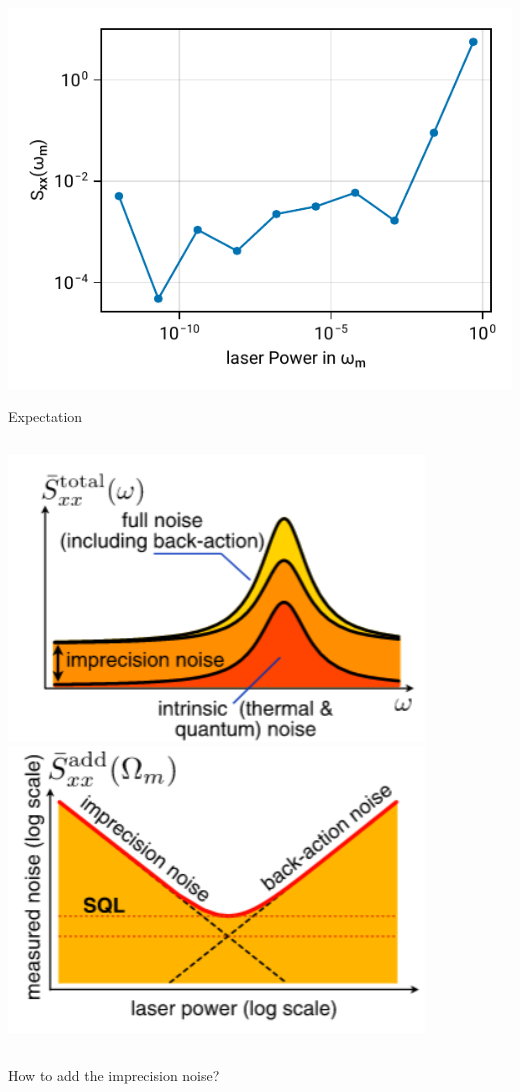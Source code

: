 \documentclass{beamer}
\begin{document}
\begin{frame}
	\centering
	\includegraphics{figures/04 power sweep.pdf}
\end{frame}

\begin{frame}{Expectation}
	\begin{columns}
		\includegraphics[width=\textwidth]{figures/a.png}
		\includegraphics[width=\textwidth]{figures/b.png}
	\end{columns}
	How to add the imprecision noise?
\end{frame}

{
	\begin{frame}[plain]{}\end{frame}
}
\end{document}
